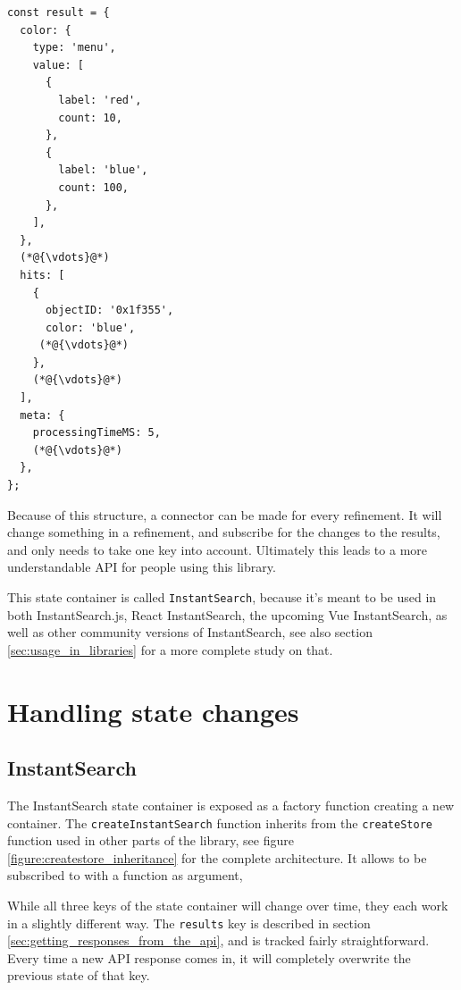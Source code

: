 \begin{lstlisting}[caption={Results container in the InstantSearch Core state},label={lst:is-core-state-4}]
const result = {
  color: {
    type: 'menu',
    value: [
      {
        label: 'red',
        count: 10,
      },
      {
        label: 'blue',
        count: 100,
      },
    ],
  },
  (*@{\vdots}@*)
  hits: [
    {
      objectID: '0x1f355',
      color: 'blue',
     (*@{\vdots}@*)
    },
    (*@{\vdots}@*)
  ],
  meta: { 
    processingTimeMS: 5,
    (*@{\vdots}@*)
  },
};
\end{lstlisting}

Because of this structure, a connector can be made for every refinement. It will change something in a refinement, and subscribe for the changes to the results, and only needs to take one key into account. Ultimately this leads to a more understandable API for people using this library.

This state container is called {\tt InstantSearch}, because it's meant to be used in both InstantSearch.js, React InstantSearch, the upcoming Vue InstantSearch, as well as other community versions of InstantSearch, see also section \ref{sec:usage_in_libraries} for a more complete study on that.


\section{Handling state changes} %
\label{sec:handling_state_changes}

\subsection{InstantSearch}
\label{ssec:instantsearch}

The InstantSearch state container is exposed as a factory function creating a new container. The {\tt createInstantSearch} function inherits from the {\tt createStore} function used in other parts of the library, see figure \ref{figure:createstore_inheritance} for the complete architecture. It allows to be subscribed to with a function as argument, %

While all three keys of the state container will change over time, they each work in a slightly different way. The {\tt results} key is described in section \ref{sec:getting_responses_from_the_api}, and is tracked fairly straightforward. Every time a new API response comes in, it will completely overwrite the previous state of that key. 

